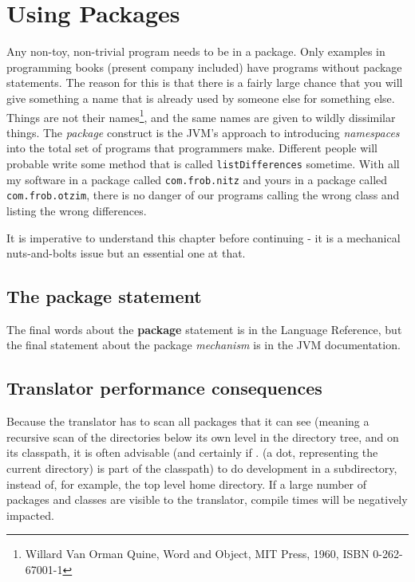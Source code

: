 {\chapter{Using Packages}
Any non-toy, non-trivial program needs to be in a package. Only
examples in programming books (present company included) have programs
without package statements. The reason
for this is that there is a fairly large chance that you will give
something a name that is already used by someone else for something
else. Things are not their names\footnote{Willard Van Orman Quine, Word
  and Object, MIT Press, 1960, ISBN 0-262-67001-1}, and the same names
are given to wildly dissimilar things. The \emph{package} construct is the JVM's approach to
introducing \emph{namespaces} into the total set of programs that
programmers make. Different people will probable write some method that is
called \texttt{listDifferences} sometime. With all my software in a
package called \texttt{com.frob.nitz} and yours in a package
called \texttt{com.frob.otzim}, there is no danger of our programs
calling the wrong class and listing the wrong differences.

It is imperative to understand this chapter before continuing - it is
a mechanical nuts-and-bolts issue but an essential one at that.

\section{The package statement}
The final words about the \nr{} \textbf{package} statement is in the
\nr{} Language Reference, but the final statement about the package
\emph{mechanism} is in the JVM documentation.
\section{Translator performance consequences}
Because the \nr{} translator has to scan all packages that it can
see (meaning a recursive scan of the directories below its own level
in the directory tree, and on its classpath, it is often advisable
(and certainly if . (a dot, representing the current directory) is part of the classpath)
to do development in a subdirectory, instead of, for example, the top
level home directory. If a large number of packages and classes are
visible to the translator, compile times will be negatively impacted. 

}
